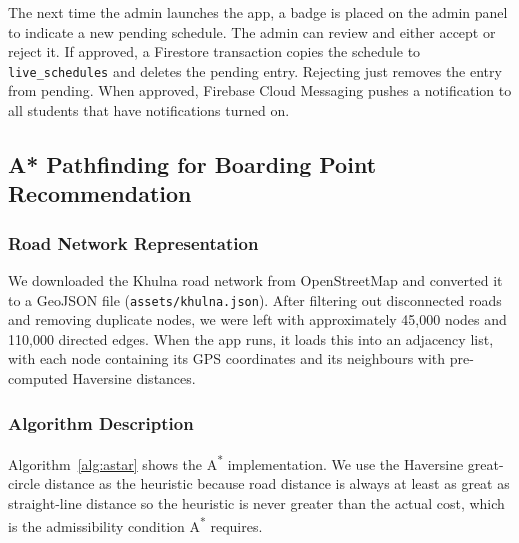 \documentclass[12pt,a4paper]{report}
\begin{document}
The next time the admin launches the app, a badge is placed on the admin panel to indicate a new pending schedule. The admin can review and either accept or reject it. If approved, a Firestore transaction copies the schedule to \texttt{live\_schedules} and deletes the pending entry. Rejecting just removes the entry from pending. When approved, Firebase Cloud Messaging pushes a notification to all students that have notifications turned on.

\subsection{A* Pathfinding for Boarding Point Recommendation}

\subsubsection{Road Network Representation}

We downloaded the Khulna road network from OpenStreetMap and converted it to a GeoJSON file (\texttt{assets/khulna.json}). After filtering out disconnected roads and removing duplicate nodes, we were left with approximately 45,000 nodes and 110,000 directed edges. When the app runs, it loads this into an adjacency list, with each node containing its GPS coordinates and its neighbours with pre-computed Haversine distances.

\subsubsection{Algorithm Description}

Algorithm~\ref{alg:astar} shows the A\textsuperscript{*} implementation. We use the Haversine great-circle distance as the heuristic because road distance is always at least as great as straight-line distance so the heuristic is never greater than the actual cost, which is the admissibility condition A\textsuperscript{*} requires.
\end{document}
